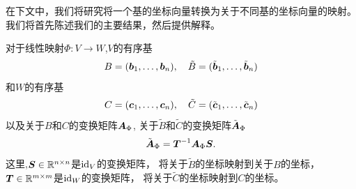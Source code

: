 在下文中，我们将研究将一个基的坐标向量转换为关于不同基的坐标向量的映射。
我们将首先陈述我们的主要结果，然后提供解释。

\begin{theorem}[基变换]
    对于线性映射$\Phi:V\rightarrow W$,$V$的有序基
    \begin{equation}
        B = (\boldsymbol{b}_1, \dots, \boldsymbol{b}_n),\quad
        \tilde{B} = (\tilde{\boldsymbol{b}}_1, \dots, \tilde{\boldsymbol{b}}_n)
    \end{equation}
    和$W$的有序基
    \begin{equation}
        C = (\boldsymbol{c}_1, \dots, \boldsymbol{c}_n),\quad
        \tilde{C} = (\tilde{\boldsymbol{c}}_1, \dots, \tilde{\boldsymbol{c}}_n)
    \end{equation}
    以及关于$B$和$C$的变换矩阵$\boldsymbol{A}_\Phi$,
    关于$\tilde{B}$和$\tilde{C}$的变换矩阵$\tilde{\boldsymbol{A}}_\Phi$
    \begin{equation}
        \tilde{\boldsymbol{A}}_\Phi = \boldsymbol{T}^{-1}\boldsymbol{A}_\Phi\boldsymbol{S}.
    \end{equation}
    这里,$\boldsymbol{S} \in \mathbb{R}^{n \times n}$是$\mathrm{id}_V$的变换矩阵，
    将关于$\tilde{B}$的坐标映射到关于$B$的坐标，
    $\boldsymbol{T} \in \mathbb{R}^{m \times m}$是$\mathrm{id}_W$的变换矩阵，
    将关于$\tilde{C}$的坐标映射到$C$的坐标。
\end{theorem}

